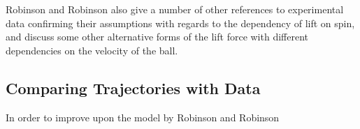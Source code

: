 Robinson and Robinson also give a number of other references to experimental data confirming their
assumptions with regards to the dependency of lift on spin, and discuss some other alternative forms
of the lift force with different dependencies on the velocity of the ball.

\subsection{Comparing Trajectories with Data}

In order to improve upon the model by Robinson and Robinson

